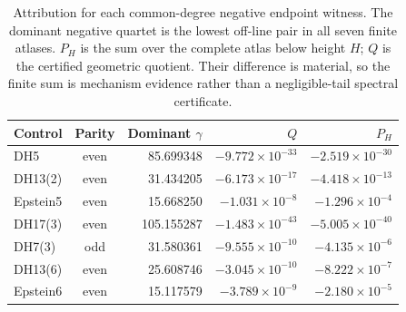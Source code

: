 \begin{table}[ht]
\centering\small
\caption{Attribution for each common-degree negative endpoint witness. The dominant negative quartet is the lowest off-line pair in all seven finite atlases. $P_H$ is the sum over the complete atlas below height $H$; $Q$ is the certified geometric quotient. Their difference is material, so the finite sum is mechanism evidence rather than a negligible-tail spectral certificate.}\label{tab:attribution}
\begin{tabular}{lcrrr}
\toprule Control & Parity & Dominant $\gamma$ & $Q$ & $P_H$\\\midrule
DH5 & even & 85.699348 & $-9.772\times10^{-33}$ & $-2.519\times10^{-30}$\\
DH13(2) & even & 31.434205 & $-6.173\times10^{-17}$ & $-4.418\times10^{-13}$\\
Epstein5 & even & 15.668250 & $-1.031\times10^{-8}$ & $-1.296\times10^{-4}$\\
DH17(3) & even & 105.155287 & $-1.483\times10^{-43}$ & $-5.005\times10^{-40}$\\
DH7(3) & odd & 31.580361 & $-9.555\times10^{-10}$ & $-4.135\times10^{-6}$\\
DH13(6) & even & 25.608746 & $-3.045\times10^{-10}$ & $-8.222\times10^{-7}$\\
Epstein6 & even & 15.117579 & $-3.789\times10^{-9}$ & $-2.180\times10^{-5}$\\
\bottomrule
\end{tabular}
\end{table}
